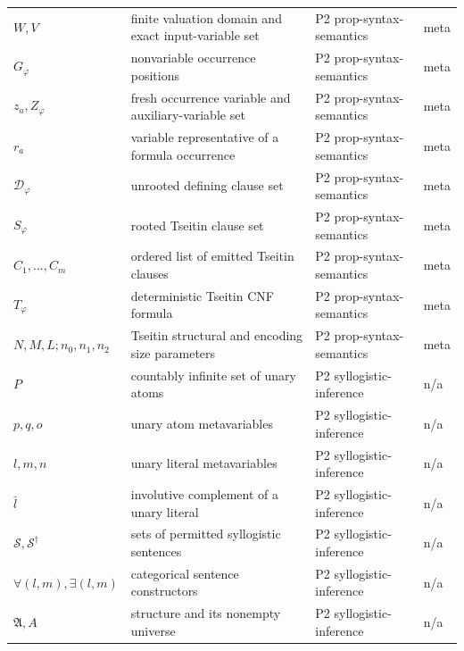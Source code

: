 \begin{longtable}{@{}p{}p{}p{}p{}@{}}
\(W,\allowbreak V\) & finite valuation domain and exact input-variable set & P2 prop-\allowbreak{}syntax-\allowbreak{}semantics & meta \\
\(G_\varphi\) & nonvariable occurrence positions & P2 prop-\allowbreak{}syntax-\allowbreak{}semantics & meta \\
\(z_a,\allowbreak Z_\varphi\) & fresh occurrence variable and auxiliary-variable set & P2 prop-\allowbreak{}syntax-\allowbreak{}semantics & meta \\
\(r_a\) & variable representative of a formula occurrence & P2 prop-\allowbreak{}syntax-\allowbreak{}semantics & meta \\
\(\mathcal D_\varphi\) & unrooted defining clause set & P2 prop-\allowbreak{}syntax-\allowbreak{}semantics & meta \\
\(S_\varphi\) & rooted Tseitin clause set & P2 prop-\allowbreak{}syntax-\allowbreak{}semantics & meta \\
\(C_1,\allowbreak \ldots,\allowbreak C_m\) & ordered list of emitted Tseitin clauses & P2 prop-\allowbreak{}syntax-\allowbreak{}semantics & meta \\
\(T_\varphi\) & deterministic Tseitin CNF formula & P2 prop-\allowbreak{}syntax-\allowbreak{}semantics & meta \\
\(N,\allowbreak M,\allowbreak L;\allowbreak n_0,\allowbreak n_1,\allowbreak n_2\) & Tseitin structural and encoding size parameters & P2 prop-\allowbreak{}syntax-\allowbreak{}semantics & meta \\
\(P\) & countably infinite set of unary atoms & P2 syllogistic-\allowbreak{}inference & n/a \\
\(p,\allowbreak q,\allowbreak o\) & unary atom metavariables & P2 syllogistic-\allowbreak{}inference & n/a \\
\(l,\allowbreak m,\allowbreak n\) & unary literal metavariables & P2 syllogistic-\allowbreak{}inference & n/a \\
\(\bar l\) & involutive complement of a unary literal & P2 syllogistic-\allowbreak{}inference & n/a \\
\(\mathcal S,\allowbreak \mathcal S^\dagger\) & sets of permitted syllogistic sentences & P2 syllogistic-\allowbreak{}inference & n/a \\
\(\forall(l,\allowbreak m),\allowbreak \exists(l,\allowbreak m)\) & categorical sentence constructors & P2 syllogistic-\allowbreak{}inference & n/a \\
\(\mathfrak A,\allowbreak A\) & structure and its nonempty universe & P2 syllogistic-\allowbreak{}inference & n/a \\

\end{longtable}
